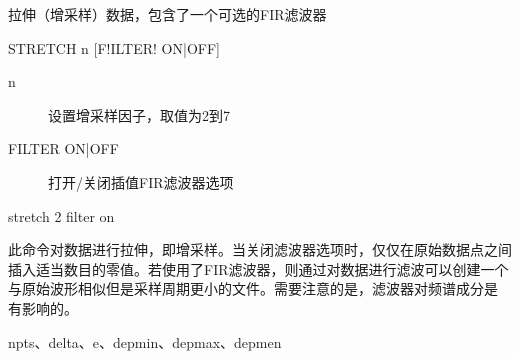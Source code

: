 \label{cmd:stretch}

拉伸（增采样）数据，包含了一个可选的FIR滤波器

\begin{SACSTX}
STRETCH n [F!ILTER! ON|OFF]
\end{SACSTX}

\begin{description}
\item [n] 设置增采样因子，取值为2到7
\item [FILTER ON|OFF] 打开/关闭插值FIR滤波器选项
\end{description}

\begin{SACDFT}
stretch 2 filter on
\end{SACDFT}

此命令对数据进行拉伸，即增采样。当关闭滤波器选项时，仅仅在原始数据点之间
插入适当数目的零值。若使用了FIR滤波器，则通过对数据进行滤波可以创建一个
与原始波形相似但是采样周期更小的文件。需要注意的是，滤波器对频谱成分是
有影响的。

npts、delta、e、depmin、depmax、depmen
